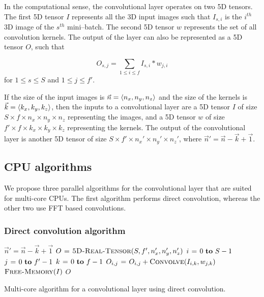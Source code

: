 \documentclass[conference]{IEEEtran}
\DeclarePairedDelimiter{\angled}{\langle}{\rangle}
\begin{document}
  In the computational sense, the convolutional layer operates on two
  5D tensors.  The first 5D tensor $I$ represents all the 3D input
  images such that $I_{s,i}$ is the $i^{th}$ 3D image of the $s^{th}$
  mini--batch.  The second 5D tensor $w$ represents the set of all
  convolution kernels.  The output of the layer can also be
  represented as a 5D tensor $O$, such that

  $$O_{s,j} = \sum_{1 \le i \le f} I_{s,i} \ast w_{j,i}$$
  for $1 \le s \le S$ and $1 \le j \le f'$.

  If the size of the input images is $\vec{n} = \angled{n_x, n_y,
  n_z}$ and the size of the kernels is $\vec{k}
  = \angled{k_x,k_y,k_z}$, then the inputs to a convolutional layer
  are a 5D tensor $I$ of size $S \times f \times n_x \times n_y \times
  n_z$ representing the images, and a 5D tensor $w$ of size $f' \times
  f \times k_x \times k_y \times k_z$ representing the kernels.  The
  output of the convolutional layer is another 5D tensor of size
  $S \times f' \times n_x' \times n_y' \times n_z'$, where $\vec{n}'
  = \vec{n} - \vec{k} + \vec{1}$.

\subsection{CPU algorithms}

  We propose three parallel algorithms for the convolutional layer
  that are suited for multi-core CPUs.  The first algorithm performs
  direct convolution, whereas the other two use FFT based
  convolutions.

\subsubsection{Direct convolution algorithm}

  \begin{algorithm}
    {\small
      \begin{codebox}
        \li $\vec{n}' = \vec{n} - \vec{k} + \vec{1}$
        \li $O \mathrel{\hspace{1pt}=\hspace{1pt}} \textnormal{\scshape5D-Real-Tensor}(S,f',n'_x,n'_y,n'_z)$
        \li {} $i \gets 0 \To S-1$
        \li   \Do {} $j \gets 0 \To f'-1$
        \li     \Do \For $k \gets 0 \To f-1$
        \li     \Do $O_{i,j} \mathrel{\hspace{1pt}=\hspace{1pt}} O_{i,j} + \textnormal{\scshape Convolve}(I_{i,k},w_{j,k})$
        \End \End \End
        \li $\textnormal{\scshape Free-Memory}(I)$
        \li \Return $O$
      \end{codebox}
    }

    \caption{Multi-core algorithm for a convolutional layer using direct
      convolution.}
    \label{alg:cpu_direct}
  \end{algorithm}
\end{document}
